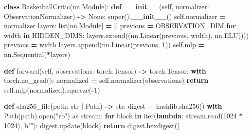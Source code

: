 \documentclass[
  american,
  11pt,
  letterpaper,
]{article}
\newenvironment{Shaded}{\begin{snugshade}}{\end{snugshade}}
\newcommand{\BuiltInTok}[1]{#1}
\newcommand{\ControlFlowTok}[1]{\textcolor[rgb]{0.13,0.29,0.53}{\textbf{#1}}}
\newcommand{\DecValTok}[1]{\textcolor[rgb]{0.00,0.00,0.81}{#1}}
\newcommand{\FunctionTok}[1]{\textcolor[rgb]{0.13,0.29,0.53}{\textbf{#1}}}
\newcommand{\ImportTok}[1]{#1}
\newcommand{\KeywordTok}[1]{\textcolor[rgb]{0.13,0.29,0.53}{\textbf{#1}}}
\newcommand{\NormalTok}[1]{#1}
\newcommand{\OperatorTok}[1]{\textcolor[rgb]{0.81,0.36,0.00}{\textbf{#1}}}
\newcommand{\StringTok}[1]{\textcolor[rgb]{0.31,0.60,0.02}{#1}}
\newcommand{\VariableTok}[1]{\textcolor[rgb]{0.00,0.00,0.00}{#1}}
\renewenvironment{Shaded}{\par\smallskip}{\par\smallskip}
\begin{document}
\begin{Shaded}
\begin{Highlighting}[]
\KeywordTok{class}\NormalTok{ BasketballCritic(nn.Module):}
    \KeywordTok{def} \FunctionTok{\_\_init\_\_}\NormalTok{(}\VariableTok{self}\NormalTok{, normalizer: ObservationNormalizer) }\OperatorTok{{-}\textgreater{}} \VariableTok{None}\NormalTok{:}
        \BuiltInTok{super}\NormalTok{().}\FunctionTok{\_\_init\_\_}\NormalTok{()}
        \VariableTok{self}\NormalTok{.normalizer }\OperatorTok{=}\NormalTok{ normalizer}
\NormalTok{        layers: }\BuiltInTok{list}\NormalTok{[nn.Module] }\OperatorTok{=}\NormalTok{ []}
\NormalTok{        previous }\OperatorTok{=}\NormalTok{ OBSERVATION\_DIM}
        \ControlFlowTok{for}\NormalTok{ width }\KeywordTok{in}\NormalTok{ HIDDEN\_DIMS:}
\NormalTok{            layers.extend((nn.Linear(previous, width), nn.ELU()))}
\NormalTok{            previous }\OperatorTok{=}\NormalTok{ width}
\NormalTok{        layers.append(nn.Linear(previous, }\DecValTok{1}\NormalTok{))}
        \VariableTok{self}\NormalTok{.mlp }\OperatorTok{=}\NormalTok{ nn.Sequential(}\OperatorTok{*}\NormalTok{layers)}

    \KeywordTok{def}\NormalTok{ forward(}\VariableTok{self}\NormalTok{, observations: torch.Tensor) }\OperatorTok{{-}\textgreater{}}\NormalTok{ torch.Tensor:}
        \ControlFlowTok{with}\NormalTok{ torch.no\_grad():}
\NormalTok{            normalized }\OperatorTok{=} \VariableTok{self}\NormalTok{.normalizer(observations)}
        \ControlFlowTok{return} \VariableTok{self}\NormalTok{.mlp(normalized).squeeze(}\OperatorTok{{-}}\DecValTok{1}\NormalTok{)}


\KeywordTok{def}\NormalTok{ sha256\_file(path: }\BuiltInTok{str} \OperatorTok{|}\NormalTok{ Path) }\OperatorTok{{-}\textgreater{}} \BuiltInTok{str}\NormalTok{:}
\NormalTok{    digest }\OperatorTok{=}\NormalTok{ hashlib.sha256()}
    \ControlFlowTok{with}\NormalTok{ Path(path).}\BuiltInTok{open}\NormalTok{(}\StringTok{"rb"}\NormalTok{) }\ImportTok{as}\NormalTok{ stream:}
        \ControlFlowTok{for}\NormalTok{ block }\KeywordTok{in} \BuiltInTok{iter}\NormalTok{(}\KeywordTok{lambda}\NormalTok{: stream.read(}\DecValTok{1024} \OperatorTok{*} \DecValTok{1024}\NormalTok{), }\StringTok{b""}\NormalTok{):}
\NormalTok{            digest.update(block)}
    \ControlFlowTok{return}\NormalTok{ digest.hexdigest()}



\end{Highlighting}
\end{Shaded}
\end{document}
